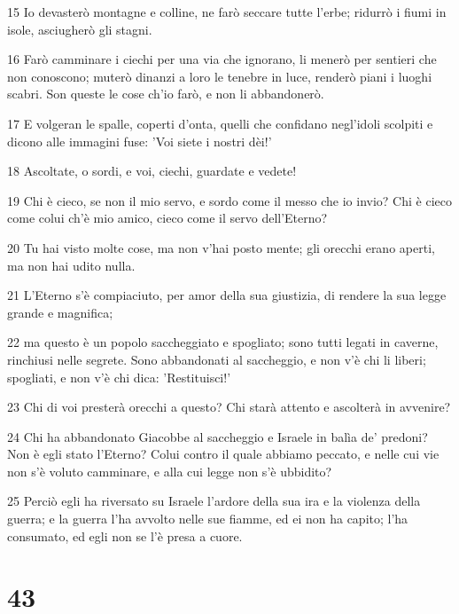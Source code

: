 \par 15 Io devasterò montagne e colline, ne farò seccare tutte l'erbe; ridurrò i fiumi in isole, asciugherò gli stagni.
\par 16 Farò camminare i ciechi per una via che ignorano, li menerò per sentieri che non conoscono; muterò dinanzi a loro le tenebre in luce, renderò piani i luoghi scabri. Son queste le cose ch'io farò, e non li abbandonerò.
\par 17 E volgeran le spalle, coperti d'onta, quelli che confidano negl'idoli scolpiti e dicono alle immagini fuse: 'Voi siete i nostri dèi!'
\par 18 Ascoltate, o sordi, e voi, ciechi, guardate e vedete!
\par 19 Chi è cieco, se non il mio servo, e sordo come il messo che io invio? Chi è cieco come colui ch'è mio amico, cieco come il servo dell'Eterno?
\par 20 Tu hai visto molte cose, ma non v'hai posto mente; gli orecchi erano aperti, ma non hai udito nulla.
\par 21 L'Eterno s'è compiaciuto, per amor della sua giustizia, di rendere la sua legge grande e magnifica;
\par 22 ma questo è un popolo saccheggiato e spogliato; sono tutti legati in caverne, rinchiusi nelle segrete. Sono abbandonati al saccheggio, e non v'è chi li liberi; spogliati, e non v'è chi dica: 'Restituisci!'
\par 23 Chi di voi presterà orecchi a questo? Chi starà attento e ascolterà in avvenire?
\par 24 Chi ha abbandonato Giacobbe al saccheggio e Israele in balìa de' predoni? Non è egli stato l'Eterno? Colui contro il quale abbiamo peccato, e nelle cui vie non s'è voluto camminare, e alla cui legge non s'è ubbidito?
\par 25 Perciò egli ha riversato su Israele l'ardore della sua ira e la violenza della guerra; e la guerra l'ha avvolto nelle sue fiamme, ed ei non ha capito; l'ha consumato, ed egli non se l'è presa a cuore.

\chapter{43}

